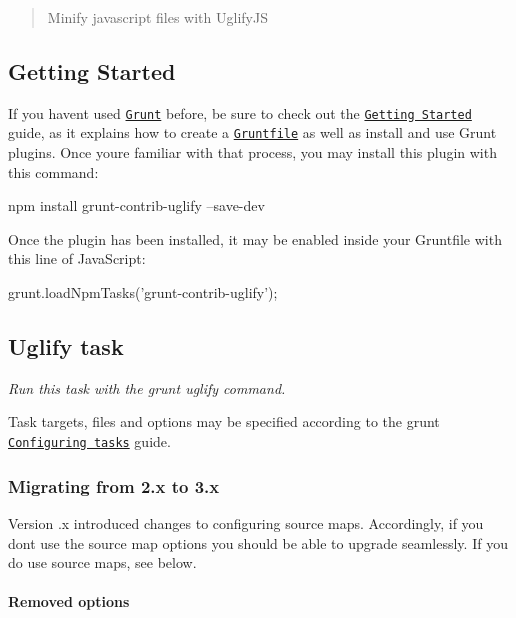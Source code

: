 \begin{quote}
Minify javascript files with Uglify\+JS \end{quote}


\subsection*{Getting Started}

If you haven\textquotesingle{}t used \href{http://gruntjs.com/}{\tt Grunt} before, be sure to check out the \href{http://gruntjs.com/getting-started}{\tt Getting Started} guide, as it explains how to create a \href{http://gruntjs.com/sample-gruntfile}{\tt Gruntfile} as well as install and use Grunt plugins. Once you\textquotesingle{}re familiar with that process, you may install this plugin with this command\+:


\begin{DoxyCode}
npm install grunt-contrib-uglify --save-dev
\end{DoxyCode}


Once the plugin has been installed, it may be enabled inside your Gruntfile with this line of Java\+Script\+:


\begin{DoxyCode}
grunt.loadNpmTasks('grunt-contrib-uglify');
\end{DoxyCode}


\subsection*{Uglify task}

{\itshape Run this task with the {\ttfamily grunt uglify} command.}

Task targets, files and options may be specified according to the grunt \href{http://gruntjs.com/configuring-tasks}{\tt Configuring tasks} guide.

\subsubsection*{Migrating from 2.\+x to 3.\+x}

Version {.\+x} introduced changes to configuring source maps. Accordingly, if you don\textquotesingle{}t use the source map options you should be able to upgrade seamlessly. If you do use source maps, see below.

\paragraph*{Removed options}

